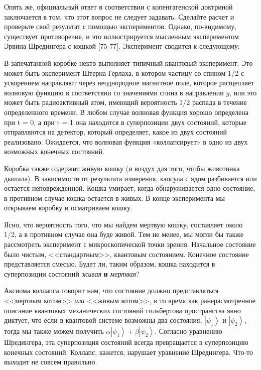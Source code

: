 \documentclass[main.tex]{subfiles}
\begin{document}
Опять же, официальный ответ в соответствии с копенгагенской доктриной заключается в том, что этот вопрос не следует задавать. Сделайте расчет и проверьте свой результат с помощью экспериментов. Однако, по-видимому, существует противоречие, и это иллюстрируется мысленным экспериментом Эрвина Шредингера с кошкой [75-77]. Эксперимент сводится к следующему:

В запечатанной коробке некто выполняет типичный квантовый эксперимент. Это может быть эксперимент Штерна Герлаха, в котором частицу со спином 1/2 с ускорением направляют через неоднородное магнитное поле, которое расщепляет волновую функцию в соответствии со значениями спина в направлении $y$, или это может быть радиоактивный атом, имеющий вероятность 1/2 распада в течение определенного времени. В любом случае волновая функция хорошо определена при t = 0, а при t = 1 она находится в суперпозиции двух состояний, которые отправляются на детектор, который определяет, какое из двух состояний реализовано. Ожидается, что волновая функция «коллапсирует» в одно из двух возможных конечных состояний.

Коробка также содержит живую кошку (и воздух для того, чтобы животинка дышала). В зависимости от результата измерения, капсула с ядом разбивается или остается неповрежденной. Кошка умирает, когда обнаруживается одно состояние, в противном случае кошка остается в живых. В конце эксперимента мы открываем коробку и осматриваем кошку.

Ясно, что вероятность того, что мы найдем мертвую кошку, составляет около 1/2, а в противном случае она буде живой. Тем не менее, мы могли бы также рассмотреть эксперимент с микроскопической точки зрения. Начальное состояние было чистым, <<стандартным>>, квантовым состоянием. Конечное состояние представляется смесью. Будет ли, таким образом, кошка находится в суперпозиции состояний \textit{живая} \textbf{и} \textit{мертвая}?

Аксиома коллапса говорит нам, что состояние  должно представляться <<мертвым котом>> \textit{или} <<живым котом>>, в то время как ранерасмотренное описание квантовых механических состояний гильбертова пространства явно диктует, что если в квантовой системе возможны два состояния, $\left|\psi_1\right>$ и $\left|\psi_2\right>$, тогда мы также можем получить $\alpha\left|\psi_1\right> + \beta\left|\psi_2\right>$. Согласно уравнению Шредингера, эта суперпозиция состояний всегда превращается в суперпозицию конечных состояний. Коллапс, кажется, нарушает уравнение Шредингера. Что-то выходит не совсем правильно.
\end{document}

